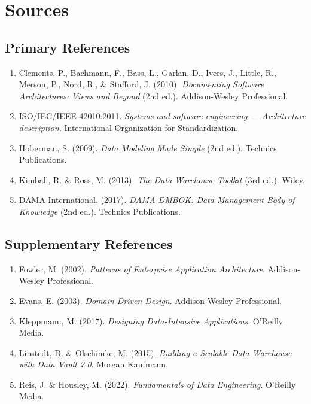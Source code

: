\documentclass[11pt,letterpaper]{article}
\begin{document}
\section{Sources}

\subsection{Primary References}

\begin{enumerate}
    \item Clements, P., Bachmann, F., Bass, L., Garlan, D., Ivers, J., Little, R., Merson, P., Nord, R., \& Stafford, J. (2010). \textit{Documenting Software Architectures: Views and Beyond} (2nd ed.). Addison-Wesley Professional.
    
    \item ISO/IEC/IEEE 42010:2011. \textit{Systems and software engineering --- Architecture description}. International Organization for Standardization.
    
    \item Hoberman, S. (2009). \textit{Data Modeling Made Simple} (2nd ed.). Technics Publications.
    
    \item Kimball, R. \& Ross, M. (2013). \textit{The Data Warehouse Toolkit} (3rd ed.). Wiley.
    
    \item DAMA International. (2017). \textit{DAMA-DMBOK: Data Management Body of Knowledge} (2nd ed.). Technics Publications.
\end{enumerate}

\subsection{Supplementary References}

\begin{enumerate}[resume]
    \item Fowler, M. (2002). \textit{Patterns of Enterprise Application Architecture}. Addison-Wesley Professional.
    
    \item Evans, E. (2003). \textit{Domain-Driven Design}. Addison-Wesley Professional.
    
    \item Kleppmann, M. (2017). \textit{Designing Data-Intensive Applications}. O'Reilly Media.
    
    \item Linstedt, D. \& Olschimke, M. (2015). \textit{Building a Scalable Data Warehouse with Data Vault 2.0}. Morgan Kaufmann.
    
    \item Reis, J. \& Housley, M. (2022). \textit{Fundamentals of Data Engineering}. O'Reilly Media.
\end{enumerate}
\end{document}
